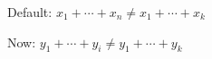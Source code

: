 \documentclass{book}
\begin{document}
\newcommand{\lvec}{}  \newcommand{%
\DEFlvec}[2]{\renewcommand{\lvec}[1][#2]{\ensuremath{#1_1+\cdots+#1_{##1}}}}
\DEFlvec{x}{n}
Default: $\lvec \neq \lvec[k]$ \par
\DEFlvec{y}{i}
Now: $\lvec \neq \lvec[k]$
\end{document}
